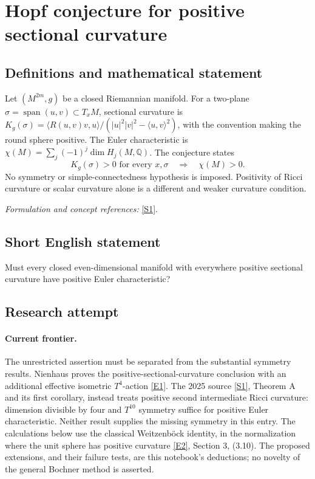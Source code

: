 \documentclass[11pt,a4paper]{article}
\newcommand{\Q}{\mathbb{Q}}
\newcommand{\sref}[2]{\hyperlink{source:#1:#2}{[S#2]}}
\newcommand{\eref}[2]{\hyperlink{extra:#1:#2}{[E#2]}}
\newif\ifshowcatalogue
\newcommand{\cataloguescope}[1]{\ifshowcatalogue
 \paragraph{Exact scope in the supplied catalogue.}
 \begin{quote}\small #1\end{quote}\fi}
\begin{document}
\setcounter{section}{210}
\clearpage
\section{\texorpdfstring{Hopf conjecture for positive sectional curvature}{Hopf conjecture for positive sectional curvature}}\label{211}
\subsection{Definitions and mathematical statement}
Let $(M^{2m},g)$ be a closed Riemannian manifold. For a two-plane $\sigma=\operatorname{span}(u,v)\subset T_xM$, sectional curvature is
$K_g(\sigma)=\langle R(u,v)v,u\rangle/(|u|^2|v|^2-\langle u,v\rangle^2)$, with the convention making the round sphere positive. The Euler characteristic is
$\chi(M)=\sum_j(-1)^j\dim H_j(M,\Q)$. The conjecture states
\[
 K_g(\sigma)>0\text{ for every }x,\sigma
 \quad\Longrightarrow\quad\chi(M)>0.
\]
No symmetry or simple-connectedness hypothesis is imposed. Positivity of Ricci curvature or scalar curvature alone is a different and weaker curvature condition.
\par\smallskip\textit{Formulation and concept references:} \sref{211}{1}.
\cataloguescope{Prove that every closed even-dimensional Riemannian manifold whose sectional curvatures are everywhere positive has positive Euler characteristic.}
\subsection{Short English statement}
Must every closed even-dimensional manifold with everywhere positive sectional curvature have positive Euler characteristic?
\subsection{Research attempt}

\paragraph{Current frontier.}
The unrestricted assertion must be separated from the substantial symmetry
results. Nienhaus proves the positive-sectional-curvature conclusion with an
additional effective isometric $T^4$-action \eref{211}{1}. The 2025 source
\sref{211}{1}, Theorem A and its first corollary, instead treats positive second
intermediate Ricci curvature: dimension divisible by four and $T^{10}$ symmetry
suffice for positive Euler characteristic. Neither result supplies the missing
symmetry in this entry. The calculations below use the classical
Weitzenb\"ock identity, in the normalization where the unit sphere has positive
curvature \eref{211}{2}, Section 3, (3.10). The proposed extensions, and their
failure tests, are this notebook's deductions; no novelty of the general
Bochner method is asserted.
\end{document}
